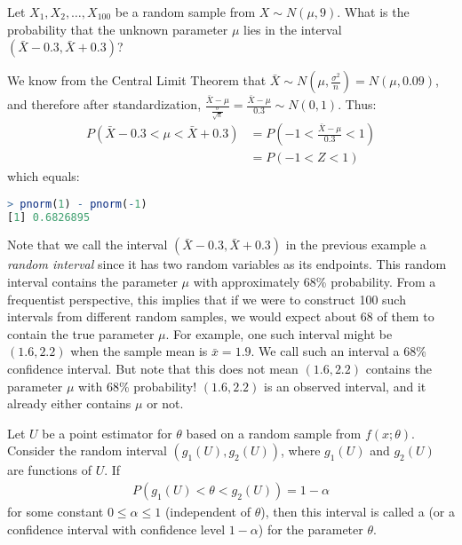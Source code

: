\begin{exmp}
    Let \( X_1, X_2, \ldots, X_{100} \) be a random sample from \( X \sim N(\mu, 9) \).
    What is the probability that the unknown parameter \( \mu \) lies in the interval \( (\bar{X} - 0.3, \bar{X} + 0.3) \)?
\end{exmp}
\begin{solution}
    We know from the Central Limit Theorem that \( \bar{X} \sim N(\mu, \frac{\sigma^2}{n}) = N(\mu, 0.09) \),
    and therefore after standardization, \( \frac{\bar{X} - \mu}{\frac{\sigma}{\sqrt{n}}} = \frac{\bar{X} - \mu}{0.3} \sim N(0, 1) \). Thus:
    \begin{align*}
        P(\bar{X} - 0.3 < \mu < \bar{X} + 0.3) &= P(-1 < \frac{\bar{X} - \mu}{0.3} < 1)\\
        &= P(-1 < Z < 1)
    \end{align*}
    which equals:
    \begin{lstlisting}[language=R]
> pnorm(1) - pnorm(-1)
[1] 0.6826895
    \end{lstlisting}
\end{solution}
Note that we call the interval \( (\bar{X} - 0.3, \bar{X} + 0.3) \) in the previous example a \emph{random interval} since it has two random variables as its endpoints.
This random interval contains the parameter \( \mu \) with approximately 68\% probability.
From a frequentist perspective, this implies that if we were to construct 100 such intervals from different random samples, we would expect about 68 of them to contain the true parameter \( \mu \).
For example, one such interval might be \( (1.6, 2.2) \) when the sample mean is \( \bar{x} = 1.9 \).
We call such an interval a 68\% confidence interval.
But note that this does not mean \( (1.6, 2.2) \) contains the parameter \( \mu \) with 68\% probability!
\( (1.6, 2.2) \) is an observed interval, and it already either contains \( \mu \) or not.

Let \( U \) be a point estimator for \( \theta \) based on a random sample from \( f(x; \theta) \).
Consider the random interval \( (g_1(U), g_2(U)) \), where \( g_1(U) \) and \( g_2(U) \) are functions of \( U \).
If
\begin{gather*}
    P(g_1(U) < \theta < g_2(U)) = 1 - \alpha
\end{gather*}
for some constant \( 0 \leq \alpha \leq 1 \) (independent of \( \theta \)),
then this interval is called a  (or a confidence interval with confidence level \( 1 - \alpha \)) for the parameter \( \theta \).

